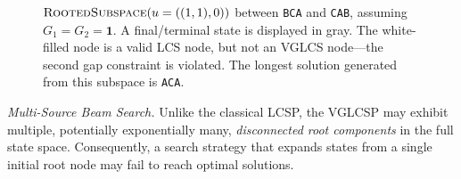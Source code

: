 \documentclass[runningheads]{llncs}
\begin{document}
\begin{figure}[h!]
{\begin{tikzpicture}[
			state/.style={circle, draw=blue!50, fill=blue!10, thick, minimum size=8mm},
			edge/.style={-Latex, thick},
			node distance=2cm and 2cm
			]
	\end{tikzpicture}}
	
	\caption{  $\textsc{RootedSubspace}(u=((1, 1), 0))$  between   \texttt{BCA} and  \texttt{CAB}, assuming $G_1=G_2=\textbf{1}$. A final/terminal state is displayed in gray. The white-filled node is a valid LCS node, but not an VGLCS node---the second gap constraint is violated. The longest solution generated from this subspace is \texttt{ACA}. %
	}
	\vspace{-0.7cm}
	\label{fig:vgcs-grafstanja}
\end{figure}

\textit{Multi-Source Beam Search.}  
Unlike the classical LCSP, the VGLCSP may exhibit multiple, potentially exponentially many, \emph{disconnected root components} in the full state space.  Consequently, a search strategy that expands states from a single initial root node may fail to reach optimal solutions. 
\end{document}
